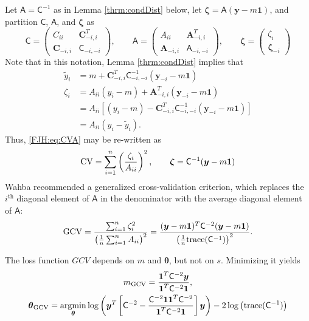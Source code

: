 \documentclass[smallextended]{svjour3}       %
\newcommand{\bm}[1]{\boldsymbol{#1}}
\newcommand{\trace}[1]{\textup{trace}{#1}}
\newcommand{\vtheta}{{\bm{\theta}}}
\newcommand{\vzeta}{{\bm{\zeta}}}
\newcommand{\vA}{\bm{A}}
\newcommand{\vC}{\bm{C}}
\newcommand{\vy}{\bm{y}}
\newcommand{\vone}{\bm{1}}
\newcommand{\mA}{\mathsf{A}}
\newcommand{\mC}{\mathsf{C}}
\providecommand{\argmin}{\operatorname*{argmin}}
\begin{document}
Let $\mA = \mC^{-1}$ as in Lemma \ref{thrm:condDist} below, let $\vzeta = \mA (\vy - m \vone)$, and partition $\mC$, $\mA$, and $\vzeta$ as
\begin{equation*}
\mC = \begin{pmatrix} C_{ii}  & \vC_{-i,i}^T \\  \vC_{-i,i} & \mC_{-i,-i}\end{pmatrix}, \qquad
\mA = \begin{pmatrix} A_{ii}  & \vA_{-i,i}^T \\  \vA_{-i,i} & \mA_{-i,-i}\end{pmatrix}, \qquad \vzeta = \begin{pmatrix} \zeta_i   \\  \vzeta_{-i} \end{pmatrix}
\end{equation*}
Note that in this notation, Lemma \ref{thrm:condDist} implies that 
\begin{align*}
\widetilde{y}_i & = m + \vC^T_{-i,i} \mC_{-i,-i}^{-1} (\vy_{-i} -m \vone)  \\
\zeta_i  & = A_{ii}(y_i - m) + \vA_{-i,i}^T(\vy_{-i} - m \vone) \\
& = A_{ii}[(y_i - m) - \vC^T_{-i,i} \mC_{-i,-i}^{-1} (\vy_{-i} -m \vone)] \\
& = A_{ii}(y_i - \widetilde{y}_i).
\end{align*}
Thus, \eqref{FJH:eq:CVA} may be re-written as 
\begin{equation} \label{FJH:eq:CVA}
\textup{CV} = \sum_{i=1}^n \left(\frac{\zeta_i}{A_{ii}} \right)^2, \qquad \vzeta = \mC^{-1}(\vy - m \vone)
\end{equation}
Wahba recommended a generalized cross-validation criterion, which replaces the $i^{\text{th}}$ diagonal element of $\mA$ in the denominator with the average diagonal element of $\mA$:
\begin{equation} \label{FJH:eq:CVA}
\textup{GCV} 
= \frac{\sum_{i=1}^n\zeta_i^2}{\left(\frac 1n \sum_{i=1}^n A_{ii} \right)^2} 
= \frac{(\vy - m\vone)^T \mC^{-2} (\vy - m \vone)}{\left(\frac 1n \trace(\mC^{-1}) \right)^2}.
\end{equation}

The loss function $GCV$ depends on $m$ and $\vtheta$, but not on $s$.  Minimizing it yields
\begin{gather}
m_{\textup{GCV}} = \frac{\vone^T \mC^{-2} \vy}{\vone^T \mC^{-2} \vone},\\ 
\vtheta_{\textup{GCV}} = \argmin_\vtheta \log \left (  \vy^T \left[\mC^{-2} - \frac{\mC^{-2} \vone \vone^T \mC^{-2}}{\vone^T \mC^{-2} \vone}  \right] \vy \right ) - 2 \log \left ( \trace(\mC^{-1}) \right )
\end{gather}
\end{document}
